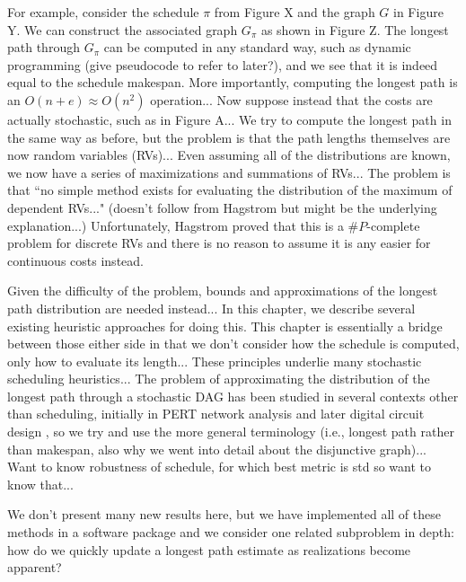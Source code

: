 \documentclass[12pt]{article}
\begin{document}
For example, consider the schedule $\pi$ from Figure X and the graph $G$ in Figure Y. We can construct the associated graph $G_\pi$ as shown in Figure Z. The longest path through $G_\pi$ can be computed in any standard way, such as dynamic programming (give pseudocode to refer to later?), and we see that it is indeed equal to the schedule makespan. More importantly, computing the longest path is an $O(n + e) \approx O(n^2)$ operation... Now suppose instead that the costs are actually stochastic, such as in Figure A... We try to compute the longest path in the same way as before, but the problem is that the path lengths themselves are now random variables (RVs)... Even assuming all of the distributions are known, we now have a series of maximizations and summations of RVs... The problem is that ``no simple method exists for evaluating the distribution of the maximum of dependent RVs..." (doesn't follow from Hagstrom but might be the underlying explanation...)  Unfortunately, Hagstrom \cite{hag88} proved that this is a $\#P$-complete problem for discrete RVs and there is no reason to assume it is any easier for continuous costs instead.   

Given the difficulty of the problem, bounds and approximations of the longest path distribution are needed instead... In this chapter, we describe several existing heuristic approaches for doing this. This chapter is essentially a bridge between those either side in that we don't consider how the schedule is computed, only how to evaluate its length... These principles underlie many stochastic scheduling heuristics...  The problem of approximating the distribution of the longest path through a stochastic DAG has been studied in several contexts other than scheduling, initially in PERT network analysis \cite{mal59} and later digital circuit design \cite{bla08}, so we try and use the more general terminology (i.e., longest path rather than makespan, also why we went into detail about the disjunctive graph)... Want to know robustness of schedule, for which best metric is std so want to know that... 

We don't present many new results here, but we have implemented all of these methods in a software package and we consider one related subproblem in depth: how do we quickly update a longest path estimate as realizations become apparent?

\end{document}
